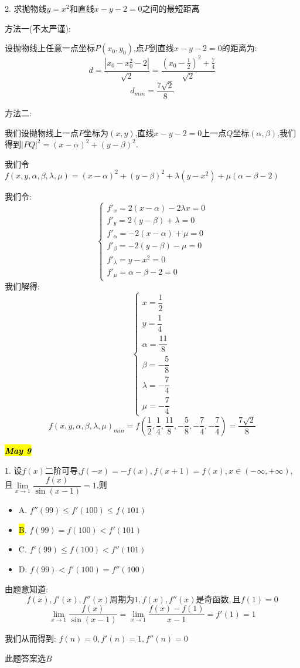2. 求抛物线$y=x^2$和直线$x-y-2=0$之间的最短距离
\begin{solution}
	
	方法一(不太严谨): 
	
	设抛物线上任意一点坐标$P(x_{0},y_{0})$,点$P$到直线$x-y-2=0$的距离为: 
	$$d=\dfrac{|x_{0}-x_{0}^2-2|}{\sqrt{2}}=\dfrac{(x_{0}-\frac{1}{2})^2+\frac{7}{4}}{\sqrt{2}}$$
	$$d_{min}=\dfrac{7\sqrt{2}}{8}$$
	
	方法二: 
	
	我们设抛物线上一点$P$坐标为$(x,y)$,直线$x-y-2=0$上一点$Q$坐标$(\alpha,\beta)$,我们得到$|PQ|^2=(x-\alpha)^2+(y-\beta)^2$.
	
	我们令$f(x,y,\alpha,\beta,\lambda,\mu)=(x-\alpha)^2+(y-\beta)^2+\lambda(y-x^2)+\mu(\alpha-\beta-2)$
	
	我们令: $$\left\lbrace 
	\begin{array}{l}
		f'_{x}=2(x-\alpha)-2\lambda x=0\\
		f'_{y}=2(y-\beta)+\lambda=0\\
		f'_{\alpha}=-2(x-\alpha)+\mu=0\\
		f'_{\beta}=-2(y-\beta)-\mu=0\\
		f'_{\lambda}=y-x^2=0\\
		f'_{\mu}=\alpha-\beta-2=0
	\end{array}
	\right. $$
	我们解得: $$\left\lbrace 
	\begin{array}{l}
		x=\dfrac{1}{2}\\
		y=\dfrac{1}{4}\\
		\alpha=\dfrac{11}{8}\\
		\beta=-\dfrac{5}{8}\\
		\lambda=-\dfrac{7}{4}\\
		\mu=-\dfrac{7}{4}
	\end{array}
	\right. $$
	$$f(x,y,\alpha,\beta,\lambda,\mu)_{min}=f(\dfrac{1}{2},\dfrac{1}{4},\dfrac{11}{8},-\dfrac{5}{8},-\dfrac{7}{4},-\dfrac{7}{4})=\dfrac{7\sqrt{2}}{8}$$
\end{solution}

\hl{\textbf{\textit{May 9}}}

1. 设$f(x)$二阶可导,$f(-x)=-f(x),f(x+1)=f(x),x\in(-\infty,+\infty)$,且$\lim\limits_{x\rightarrow 1}\dfrac{f(x)}{\sin(x-1)}=1$,则
\begin{itemize}
	\item A. $f''(99)\leq f'(100)\leq f(101)$ 
	\item \hl{B}. $f(99)=f(100)<f'(101)$ 
	\item C. $f'(99)\leq f(100)<f''(101)$ 
	\item D. $f(99)< f'(100)=f''(100)$ 
\end{itemize}
\begin{solution}
	
	由题意知道: $$f(x),f'(x),f''(x)\text{周期为}1,f(x),f''(x)\text{是奇函数},\text{且}f(1)=0$$
	$$\lim\limits_{x\rightarrow 1}\frac{f(x)}{\sin(x-1)}=\lim\limits_{x\rightarrow 1}\frac{f(x)-f(1)}{x-1}=f'(1)=1$$
	
	我们从而得到: $f(n)=0,f'(n)=1,f''(n)=0$
	
	此题答案选$B$
\end{solution}

